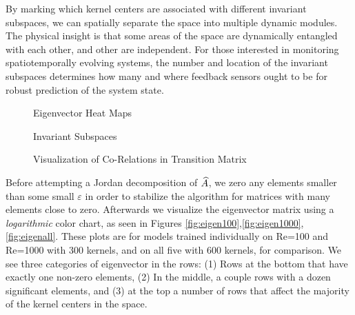 By marking which kernel centers are associated with different invariant subspaces, we can spatially separate the space into multiple dynamic modules. The physical insight is that some areas of the space are dynamically entangled with each other, and other are independent. For those interested in monitoring spatiotemporally evolving systems, the number and location of the invariant subspaces determines how many and where feedback sensors ought to be for robust prediction of the system state.
\begin{figure*}[h] %
	\centering
	\caption{Eigenvector Heat Maps}
\end{figure*}
\begin{figure*}[h] %
	\centering
	\caption{Invariant Subspaces}
	\label{fig:subspaces}
\end{figure*}
\begin{figure*}[h] %
	\centering
	\caption{Visualization of Co-Relations in Transition Matrix}
\end{figure*}
Before attempting a Jordan decomposition of $\widehat{A}$, we zero any elements smaller than some small $\varepsilon$ in order to stabilize the algorithm for matrices with many elements close to zero. Afterwards we visualize the eigenvector matrix using a \emph{logarithmic} color chart, as seen in Figures \ref{fig:eigen100},\ref{fig:eigen1000},\ref{fig:eigenall}. These plots are for models trained individually on Re=100 and Re=1000 with 300 kernels, and on all five with 600 kernels, for comparison. We see three categories of eigenvector in the rows: (1) Rows at the bottom that have exactly one non-zero elements, (2) In the middle, a couple rows with a dozen significant elements, and (3) at the top a number of rows that affect the majority of the kernel centers in the space.

